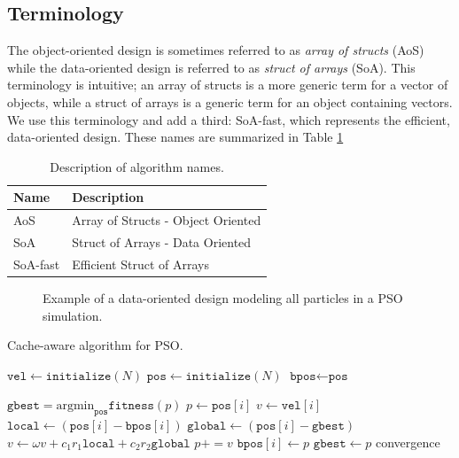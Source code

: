 \subsection{Terminology}
The object-oriented design is sometimes referred to as \emph{array of structs} (AoS) while
the data-oriented design is referred to as \emph{struct of arrays} (SoA). This
terminology is intuitive; an array of structs is a more generic term for a
vector of objects, while a struct of arrays is a generic term for an object
containing vectors.
We use this terminology and add a third: SoA-fast, which
represents the efficient, data-oriented design. These names are summarized in
Table \ref{tab:names}

\begin{table}
  \centering
  \caption{Description of algorithm names.}
  \label{tab:names}
  \begin{tabular}{ll}\toprule
    \textbf{Name} & \textbf{Description}\\\midrule
    AoS & Array of Structs - Object Oriented\\
    SoA & Struct of Arrays - Data Oriented\\
    SoA-fast & Efficient Struct of Arrays\\\bottomrule
  \end{tabular}
\end{table}

          

\begin{figure}
  
  \caption{Example of a data-oriented design modeling all particles in a PSO
    simulation.}\label{fig:particles}
\end{figure}

\begin{algorithm}
  \caption{Cache-aware algorithm for PSO.}\label{alg:pso-cache}
  \begin{algorithmic}[1]
    \State $\texttt{vel} \gets \texttt{initialize}(N)$ 
    \State $\texttt{pos} \gets \texttt{initialize}(N)$ 
    \State $\texttt{bpos} \gets \texttt{pos}$ 

    \Repeat
    \State $\texttt{gbest} = \text{argmin}_{\texttt{pos}}\texttt{fitness}(p)$
    \State $p \gets \texttt{pos}[i]$
    \State $v \gets \texttt{vel}[i]$
    \State $\texttt{local} \gets (\texttt{pos}[i] -
    \texttt{bpos}[i])$
    \State $\texttt{global} \gets  (\texttt{pos}[i]
    - \texttt{gbest})$
    \State $v \gets \omega v + c_1 r_1 \texttt{local}  + c_2 r_2 \texttt{global}$
    \State $p += v$
      \State $\texttt{bpos}[i] \gets p$
      \State $\texttt{gbest} \gets p$
      \EndIf
    \EndIf
    \EndFor
    \Until convergence
    \EndProcedure
  \end{algorithmic}
\end{algorithm}

